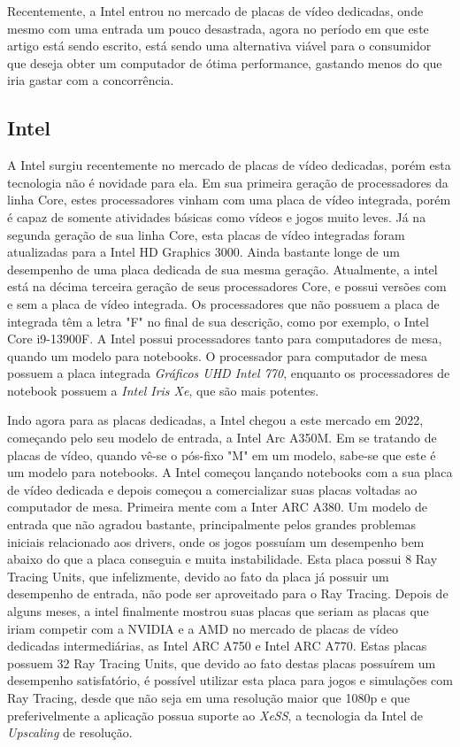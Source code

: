 \documentclass[journal]{IEEEtran}
\begin{document}
Recentemente, a Intel entrou no mercado de placas de vídeo dedicadas, onde mesmo com uma
entrada um pouco desastrada, agora no período em que este artigo está sendo escrito, está
sendo uma alternativa viável para o consumidor que deseja obter um computador de ótima
performance, gastando menos do que iria gastar com a concorrência.


\subsection{Intel}
A Intel surgiu recentemente no mercado de placas de vídeo dedicadas, porém esta tecnologia
não é novidade para ela. Em sua primeira geração de processadores da linha Core, estes 
processadores vinham com uma placa de vídeo integrada, porém é capaz de somente atividades
básicas como vídeos e jogos muito leves.\cite{c16} Já na segunda geração de sua linha Core,
esta placas de vídeo integradas foram atualizadas para a Intel HD Graphics 3000. \cite{c17}
Ainda bastante longe de um desempenho de uma placa dedicada de sua mesma geração. Atualmente,
a intel está na décima terceira geração de seus processadores Core, e possui versões com e
sem a placa de vídeo integrada. Os processadores que não possuem a placa de integrada têm
a letra "F" no final de sua descrição, como por exemplo, o Intel Core i9-13900F. A Intel
possui processadores tanto para computadores de mesa, quando um modelo para notebooks. O
processador para computador de mesa possuem a placa integrada \emph{Gráficos UHD Intel 770},
enquanto os processadores de notebook possuem a \emph{Intel Iris Xe}, que são mais potentes.

Indo agora para as placas dedicadas, a Intel chegou a este mercado em 2022, começando pelo
seu modelo de entrada, a Intel Arc A350M. Em se tratando de placas de vídeo, quando vê-se o
pós-fixo "M" em um modelo, sabe-se que este é um modelo para notebooks. A Intel começou lançando
notebooks com a sua placa de vídeo dedicada e depois começou a comercializar suas placas
voltadas ao computador de mesa. Primeira mente com a Inter ARC A380. Um modelo de entrada que
não agradou bastante, principalmente pelos grandes problemas iniciais relacionado aos drivers,
onde os jogos possuíam um desempenho bem abaixo do que a placa conseguia e muita instabilidade.
Esta placa possui 8 Ray Tracing Units, que infelizmente, devido ao fato da placa já possuir
um desempenho de entrada, não pode ser aproveitado para o Ray Tracing. Depois de alguns meses,
a intel finalmente mostrou suas placas que seriam as placas que iriam competir com a NVIDIA e
a AMD no mercado de placas de vídeo dedicadas intermediárias, as Intel ARC A750 e Intel ARC
A770. Estas placas possuem 32 Ray Tracing Units, que devido ao fato destas placas possuírem
um desempenho satisfatório, é possível utilizar esta placa para jogos e simulações com Ray 
Tracing, desde que não seja em uma resolução maior que 1080p e que preferivelmente a aplicação
possua suporte ao \emph{XeSS}, a tecnologia da Intel de \emph{Upscaling} de resolução.
\end{document}
